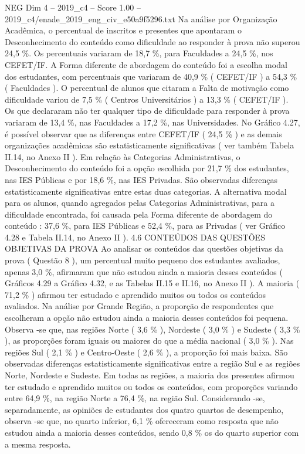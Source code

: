 \begin{textsample}{NEG Dim 4 – 2019\_c4 – Score 1.00 – 2019\_c4/enade\_2019\_eng\_civ\_e50a9f5296.txt}
Na análise por Organização Acadêmica, o percentual de inscritos e presentes que apontaram o Desconhecimento do conteúdo como dificuldade ao responder à prova não superou 24,5 \%.
Os percentuais variaram de 18,7 \%, para Faculdades a 24,5 \%, nos CEFET/IF.
A Forma diferente de abordagem do conteúdo foi a escolha modal dos estudantes, com percentuais que variaram de 40,9 \% ( CEFET/IF ) a 54,3 \% ( Faculdades ).
O percentual de alunos que citaram a Falta de motivação como dificuldade variou de 7,5 \% ( Centros Universitários ) a 13,3 \% ( CEFET/IF ).
Os que declararam não ter qualquer tipo de dificuldade para responder à prova variaram de 13,4 \%, nas Faculdades a 17,2 \%, nas Universidades.
No Gráfico 4.27, é possível observar que as diferenças entre CEFET/IF ( 24,5 \% ) e as demais organizações acadêmicas são estatisticamente significativas ( ver também Tabela II.14, no Anexo II ).
Em relação às Categorias Administrativas, o Desconhecimento do conteúdo foi a opção escolhida por 21,7 \% dos estudantes, nas IES Públicas e por 18,6 \%, nas IES Privadas.
São observadas diferenças estatisticamente significativas entre estas duas categorias.
A alternativa modal para os alunos, quando agregados pelas Categorias Administrativas, para a dificuldade encontrada, foi causada pela Forma diferente de abordagem do conteúdo : 37,6 \%, para IES Públicas e 52,4 \%, para as Privadas ( ver Gráfico 4.28 e Tabela II.14, no Anexo II ). 4.6 CONTEÚDOS DAS QUESTÕES OBJETIVAS DA PROVA Ao analisar os conteúdos das questões objetivas da prova ( Questão 8 ), um percentual muito pequeno dos estudantes avaliados, apenas 3,0 \%, afirmaram que não estudou ainda a maioria desses conteúdos ( Gráficos 4.29 a Gráfico 4.32, e as Tabelas II.15 e II.16, no Anexo II ).
A maioria ( 71,2 \% ) afirmou ter estudado e aprendido muitos ou todos os conteúdos avaliados.
Na análise por Grande Região, a proporção de respondentes que escolheram a opção não estudou ainda a maioria desses conteúdos foi pequena.
Observa -se que, nas regiões Norte ( 3,6 \% ), Nordeste ( 3,0 \% ) e Sudeste ( 3,3 \% ), as proporções foram iguais ou maiores do que a média nacional ( 3,0 \% ).
Nas regiões Sul ( 2,1 \% ) e Centro-Oeste ( 2,6 \% ), a proporção foi mais baixa.
São observadas diferenças estatisticamente significativas entre a região Sul e as regiões Norte, Nordeste e Sudeste.
Em todas as regiões, a maioria dos presentes afirmou ter estudado e aprendido muitos ou todos os conteúdos, com proporções variando entre 64,9 \%, na região Norte a 76,4 \%, na região Sul.
Considerando -se, separadamente, as opiniões de estudantes dos quatro quartos de desempenho, observa -se que, no quarto inferior, 6,1 \% ofereceram como resposta que não estudou ainda a maioria desses conteúdos, sendo 0,8 \% os do quarto superior com a mesma resposta.

\end{textsample}
